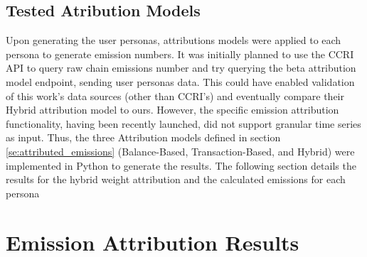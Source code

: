 \documentclass[11pt]{report}
\begin{document}
\subsection{Tested Atribution Models}

Upon generating the user personas, attributions models were applied to each persona to generate emission numbers. It was initially planned to use the \ac{CCRI} API to query raw chain emissions number and try querying the beta attribution model endpoint, sending user personas data. This could have enabled validation of this work's data sources (other than CCRI's) and eventually compare their Hybrid attribution model to ours. However, the specific emission attribution functionality, having been recently launched, did not support granular time series as input. Thus, the three Attribution models defined in section \ref{se:attributed_emissions} (Balance-Based, Transaction-Based, and Hybrid) were implemented in Python to generate the results. The following section details the results for the hybrid weight attribution and the calculated emissions for each persona





\section{Emission Attribution Results}
\end{document}
